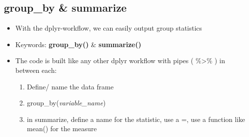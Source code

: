 \documentclass[
]{book}
\providecommand{\tightlist}{%
  \setlength{\itemsep}{0pt}\setlength{\parskip}{0pt}}
\begin{document}
\subsection{group\_by \& summarize}\label{group_by-summarize}

\begin{itemize}
\tightlist
\item
  With the dplyr-workflow, we can easily output group statistics
\item
  Keywords: \textbf{group\_by()} \& \textbf{summarize()}
\item
  The code is built like any other dplyr workflow with pipes ( \%\textgreater\% ) in between each:

  \begin{enumerate}
  \def\labelenumi{\arabic{enumi}.}
  \tightlist
  \item
    Define/ name the data frame
  \item
    group\_by(\emph{variable\_name})
  \item
    in summarize, define a name for the statistic, use a =, use a function like mean() for the measure
  \end{enumerate}
\end{itemize}
\end{document}
